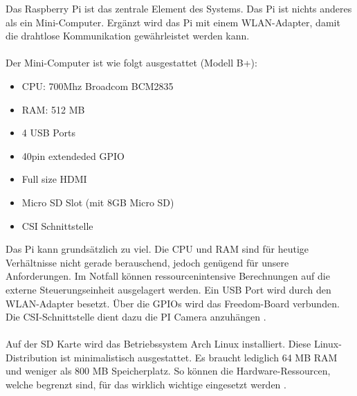 Das Raspberry Pi ist das zentrale Element des Systems. Das Pi ist nichts anderes als ein Mini-Computer. Ergänzt wird das Pi mit einem WLAN-Adapter, damit die drahtlose Kommunikation gewährleistet werden kann. \\
\\
Der Mini-Computer ist wie folgt ausgestattet (Modell B+):
\begin{itemize}
	\item CPU: 700Mhz Broadcom BCM2835
	\item RAM: 512 MB
	\item 4 USB Ports
	\item 40pin extendeded GPIO
	\item Full size HDMI
	\item Micro SD Slot (mit 8GB Micro SD)
	\item CSI Schnittstelle
\end{itemize}

Das Pi kann grundsätzlich zu viel. Die CPU und RAM sind für heutige Verhältnisse nicht gerade berauschend, jedoch genügend für unsere Anforderungen. Im Notfall können ressourcenintensive Berechnungen auf die externe Steuerungseinheit ausgelagert werden. Ein USB Port wird durch den WLAN-Adapter besetzt. Über die GPIOs wird das Freedom-Board verbunden. Die CSI-Schnittstelle dient dazu die PI Camera anzuhängen \cite{raspberri-b-plus-spec}.\\
\\
Auf der SD Karte wird das Betriebssystem Arch Linux installiert. Diese Linux-Distribution ist minimalistisch ausgestattet. Es braucht lediglich 64 MB RAM und weniger als 800 MB Speicherplatz. So können die Hardware-Ressourcen, welche begrenzt sind, für das wirklich wichtige eingesetzt werden \cite{arch-linux-system-requirements}.
